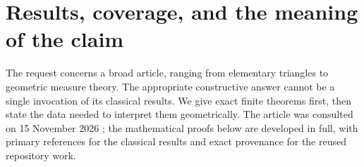 \documentclass[11pt,a4paper]{article}
\theoremstyle{definition}
\begin{document}
\setcounter{tocdepth}{1}
\tableofcontents
\clearpage
{}

\section{Results, coverage, and the meaning of the claim}

The request concerns a broad article, ranging from elementary triangles
to geometric measure theory. The appropriate constructive answer cannot
be a single invocation of its classical results. We give exact finite
theorems first, then state the data needed to interpret them geometrically.
The article was consulted on 15 November 2026 \cite{Wikipedia}; the
mathematical proofs below are developed in full, with primary references
for the classical results and exact provenance for the reused repository
work.
\end{document}

